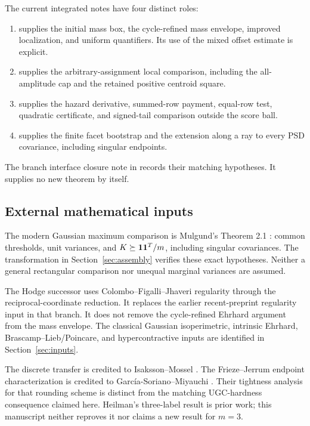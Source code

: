 The current integrated notes have four distinct roles:
\begin{enumerate}
\raggedright
\item \cite[Sections 2--4]{currentassembly} supplies the initial mass box,
the cycle-refined mass envelope, improved localization, and uniform
quantifiers. Its use of the mixed offset estimate is explicit.
\item \cite[Sections 1--6]{currentlocal} supplies the arbitrary-assignment
local comparison, including the all-amplitude cap and the retained positive
centroid square.
\item \cite[Sections 2--9]{currentexterior} supplies the hazard derivative,
summed-row payment, equal-row test, quadratic certificate, and signed-tail
comparison outside the score ball.
\item \cite{currentgap} supplies the finite facet bootstrap and the extension
along a ray to every PSD covariance, including singular endpoints.
\end{enumerate}
The branch interface closure note in 
records their matching hypotheses. It supplies no new theorem by itself.

\subsection{External mathematical inputs}
The modern Gaussian maximum comparison is Mulgund's
Theorem 2.1 \cite{Mulgund}: common thresholds, unit variances, and
$K\succeq\mathbf 1\mathbf 1^T/m$, including singular covariances. The transformation
in Section~\ref{sec:assembly} verifies these exact hypotheses.
Neither a general rectangular comparison nor unequal marginal variances
are assumed.

The Hodge successor uses Colombo--Figalli--Jhaveri regularity \cite{CFJ}
through the reciprocal-coordinate reduction. It replaces the earlier
recent-preprint regularity input in that branch. It does not remove the
cycle-refined Ehrhard argument from the mass envelope. The classical
Gaussian isoperimetric, intrinsic Ehrhard, Brascamp--Lieb/Poincare, and
hypercontractive inputs are identified in Section~\ref{sec:inputs}.

The discrete transfer is credited to Isaksson--Mossel \cite{IM}.
The Frieze--Jerrum endpoint characterization is credited to
Garc\'ia-Soriano--Miyauchi \cite{GSM}. Their tightness analysis for that
rounding scheme is distinct from the matching UGC-hardness consequence
claimed here. Heilman's three-label result \cite{Heilman} is prior work;
this manuscript neither reproves it nor claims a new result for $m=3$.

